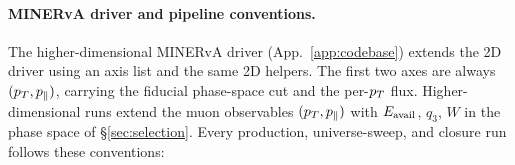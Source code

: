 \paragraph{MINERvA driver and pipeline conventions.} The higher-dimensional MINERvA driver (App.~\ref{app:codebase}) extends the 2D driver using an axis list and the same 2D helpers. The first two axes are always $(p_{T},p_{\parallel})$, carrying the fiducial phase-space cut and the per-$p_{T}$ flux. Higher-dimensional runs extend the muon observables $(p_{T},p_{\parallel})$ with $E_{\mathrm{avail}}$, $q_{3}$, $W$ in the phase space of \S\ref{sec:selection}. Every production, universe-sweep, and closure run follows these conventions:
